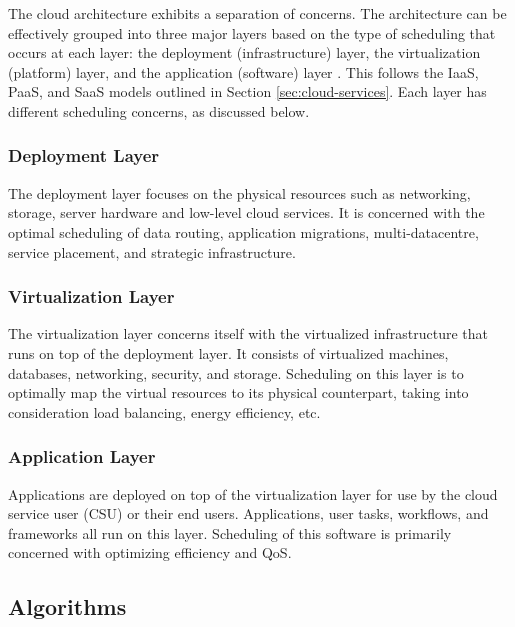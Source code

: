 \documentclass[12pt]{article}
\begin{document}
The cloud architecture exhibits a separation of concerns.  The architecture can be effectively grouped into three major layers based on the type of scheduling that occurs at each layer: the deployment (infrastructure) layer, the virtualization (platform) layer, and the application (software) layer \cite{zhan2015cloud}. This follows the IaaS, PaaS, and SaaS models outlined in Section \ref{sec:cloud-services}. Each layer has different scheduling concerns, as discussed below.


\subsubsection{Deployment Layer}

The deployment layer focuses on the physical resources such as networking, storage, server hardware and low-level cloud services. It is concerned with the optimal scheduling of data routing, application migrations, multi-datacentre, service placement, and strategic infrastructure.



\subsubsection{Virtualization Layer}

The virtualization layer concerns itself with the virtualized infrastructure that runs on top of the deployment layer. It consists of virtualized machines, databases, networking, security, and storage. Scheduling on this layer is to optimally map the virtual resources to its physical counterpart, taking into consideration load balancing, energy efficiency, etc.



\subsubsection{Application Layer}

Applications are deployed on top of the virtualization layer for use by the cloud service user (CSU) or their end users. Applications, user tasks, workflows, and frameworks all run on this layer. Scheduling of this software is primarily concerned with optimizing efficiency and QoS.





\subsection{Algorithms} \label{sub:schedalgorithms}
\end{document}
